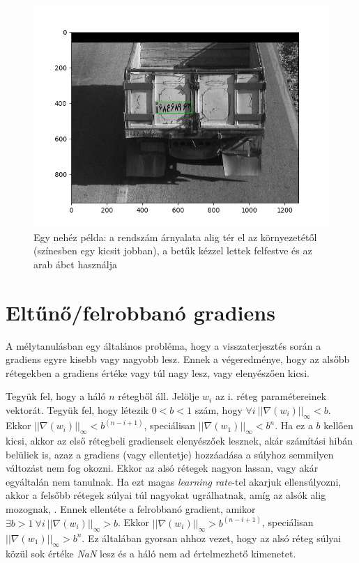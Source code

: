 \documentclass{article}
\begin{document}
\begin{figure}[h!]
    \centering
    \includegraphics[scale=1.0]{difficult_example_orig_dataset.png}
    \caption{Egy nehéz példa: a rendszám árnyalata alig tér el az környezetétől (színesben egy kicsit jobban), a betűk kézzel lettek felfestve és az arab ábct használja}
    \label{fig:difficult_example}
\end{figure}

\section{Eltűnő/felrobbanó gradiens}
A mélytanulásban egy általános probléma, hogy a visszaterjesztés során a gradiens egyre kisebb vagy nagyobb lesz. Ennek a végeredménye, hogy az alsőbb rétegekben a gradiens értéke vagy túl nagy lesz, vagy elenyészően kicsi.

Tegyük fel, hogy a háló $n$ rétegből áll. Jelölje $w_i$ az i. réteg paramétereinek vektorát. Tegyük fel, hogy létezik $0 < b < 1$ szám, hogy $\forall i \  ||\nabla (w_i)||_{\infty} < b$. Ekkor $||\nabla (w_i)||_{\infty} < b^{(n-i+1)}$, speciálisan $||\nabla (w_1)||_{\infty} < b^n$. Ha ez a $b$ kellően kicsi, akkor az első rétegbeli gradiensek elenyészőek lesznek, akár számítási hibán belüliek is, azaz a gradiens (vagy ellentetje) hozzáadása a súlyhoz semmilyen változást nem fog okozni. Ekkor az alsó rétegek nagyon lassan, vagy akár egyáltalán nem tanulnak. Ha ezt magas \textit{learning rate}-tel akarjuk ellensúlyozni, akkor a felsőbb rétegek súlyai túl nagyokat ugrálhatnak, amíg az alsók alig mozognak, . Ennek ellentéte a felrobbanó gradient, amikor $\exists b > 1 \ \forall i \  ||\nabla (w_i)||_{\infty} > b$. Ekkor  $||\nabla (w_i)||_{\infty} > b^{(n-i+1)}$, speciálisan $||\nabla (w_1)||_{\infty} > b^n$. Ez általában gyorsan ahhoz vezet, hogy az alsó réteg súlyai közül sok értéke \textit{NaN} lesz és a háló nem ad értelmezhető kimenetet.
\end{document}
